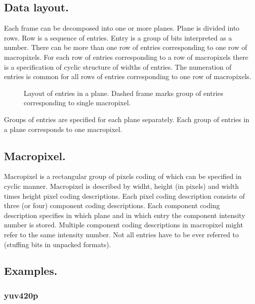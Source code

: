 \subsection{Data layout.}

Each frame can be decomposed into one or more planes. Plane is divided into rows. Row is a sequence of entries. Entry is a group of bits interpreted as a number. There can be more than one row of entries corresponding to one row of macropixels. For each row of entries corresponding to a row of macropixels there is a specification of cyclic structure of widths of entries. The numeration of entries is common for all rows of entries corresponding to one row of macropixels.

\begin{figure}[ht]
  \begin{center}
    \def\svgwidth{380pt}
    
    \caption{Layout of entries in a plane. Dashed frame marks group of entries corresponding to single macropixel.\label{fig:entries_in_plane}}
  \end{center}
\end{figure}

Groups of entries are specified for each plane separately. Each group of entries in a plane corresponds to one macropixel.

\subsection{Macropixel.}

Macropixel is a rectangular group of pixels coding of which can be specified in cyclic manner. Macropixel is described by widht, height (in pixels) and width times height pixel coding descriptions. Each pixel coding description consists of three (or four) component coding descriptions. Each component coding description specifies in which plane and in which entry the component intensity number is stored. Multiple component coding descriptions in macropixel might refer to the same intensity number. Not all entries have to be ever referred to (stuffing bits in unpacked formats).

\subsection{Examples.}

\subsubsection{yuv420p}


